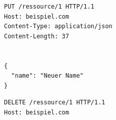 \noindent\begin{minipage}{\textwidth}
\begin{lstlisting}[caption={Ressource updaten (Put)},captionpos=b,label={lst:update}]
PUT /ressource/1 HTTP/1.1
Host: beispiel.com
Content-Type: application/json
Content-Length: 37


{
  "name": "Neuer Name"
}

\end{lstlisting}
\end{minipage}

\noindent\begin{minipage}{\textwidth}
\begin{lstlisting}[caption={Ressource löschen (delete)},captionpos=b,label={lst:delete}]
DELETE /ressource/1 HTTP/1.1
Host: beispiel.com

\end{lstlisting}
\end{minipage}

